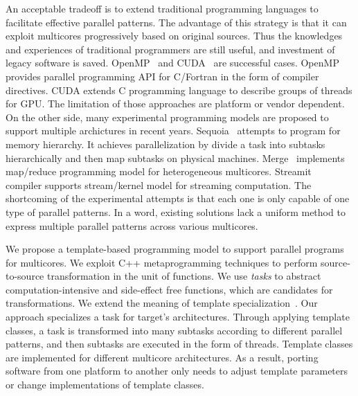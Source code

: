 An acceptable tradeoff is to extend traditional programming
languages to facilitate effective parallel patterns. The advantage of
this strategy is that it can exploit multicores progressively based on
original sources. Thus the
knowledges and
experiences of traditional programmers are still useful, and investment
of legacy software is saved. OpenMP~\cite{openmp}  and
CUDA~\cite{cuda} are successful cases. OpenMP provides parallel
programming API for C/Fortran in the form of compiler directives. CUDA extends C programming language to describe
groups of threads for GPU. The limitation of those approaches are
platform or vendor dependent. On the other side, many experimental
programming models are proposed to support multiple archictures in recent years.
Sequoia~\cite{sequoia} attempts to program for memory hierarchy. It
achieves parallelization by divide a task into subtasks hierarchically and then map
subtasks on physical machines. Merge~\cite{merge} implements
map/reduce programming model for heterogeneous
multicores. Streamit~\cite{ThiesKA02} compiler supports stream/kernel
model for streaming computation. The shortcoming of the experimental
attempts is that each one
is only capable of one type of parallel patterns.  In a word, existing solutions
lack a uniform method to express multiple parallel patterns
across various multicores.

We propose a template-based programming model to
support parallel programs for multicores. We exploit C++
metaprogramming techniques to perform source-to-source transformation
in the unit of functions. We use \emph{tasks} to abstract
computation-intensive and side-effect free functions, which are candidates for transformations. We extend the meaning of template
specialization~\cite{tcpl}. Our approach specializes a task for target's
architectures.  Through applying template classes, a task is
transformed into many subtasks according to different parallel
patterns, and then subtasks are executed in the form of threads.
Template classes are implemented for different multicore
architectures. As a result, porting software from one platform to another only
needs to adjust template parameters or change implementations of
template classes. 

